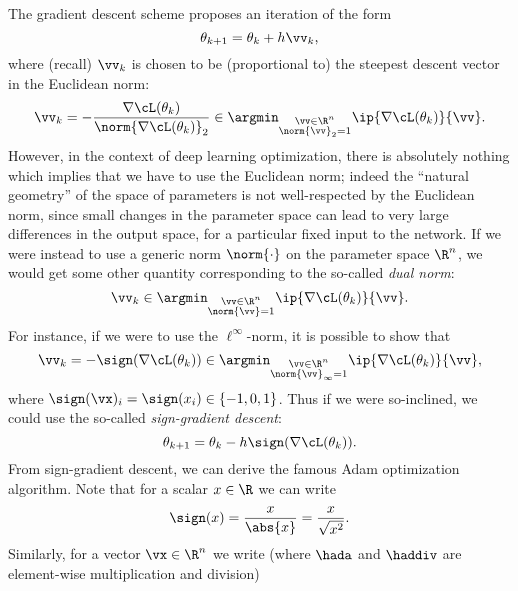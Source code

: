 \documentclass[../../book-main.tex]{subfiles}
\begin{document}
The gradient descent scheme proposes an iteration of the form 
\begin{equation}
    \theta_{k + 1} = \theta_{k} + h\vv_{k},
\end{equation}
where (recall) \(\vv_{k}\) is chosen to be (proportional to) the steepest descent vector in the Euclidean norm:
\begin{equation}
    \vv_{k} = -\frac{\nabla \cL(\theta_{k})}{\norm{\nabla \cL(\theta_{k})}_{2}} \in \argmin_{\substack{\vv \in \R^{n} \\ \norm{\vv}_{2} = 1}}\ip{\nabla \cL(\theta_{k})}{\vv}.
\end{equation}
However, in the context of deep learning optimization, there is absolutely nothing which implies that we have to use the Euclidean norm; indeed the ``natural geometry'' of the space of parameters is not well-respected by the Euclidean norm, since small changes in the parameter space can lead to very large differences in the output space, for a particular fixed input to the network. If we were instead to use a generic norm \(\norm{\cdot}\) on the parameter space \(\R^{n}\), we would get some other quantity corresponding to the so-called \textit{dual norm}:
\begin{equation}
    \vv_{k} \in \argmin_{\substack{\vv \in \R^{n} \\ \norm{\vv} = 1}}\ip{\nabla \cL(\theta_{k})}{\vv}.
\end{equation}
For instance, if we were to use the \(\ell^{\infty}\)-norm, it is possible to show that 
\begin{equation}
    \vv_{k} = -\sign(\nabla \cL(\theta_{k})) \in \argmin_{\substack{\vv \in \R^{n} \\ \norm{\vv}_{\infty} = 1}}\ip{\nabla \cL(\theta_{k})}{\vv},
\end{equation}
where \(\sign(\vx)_{i} = \sign(x_{i}) \in \{-1, 0, 1\}\). Thus if we were so-inclined, we could use the so-called \textit{sign-gradient descent}:
\begin{equation}\label{eq:sign_gradient_descent}
    \theta_{k + 1} = \theta_{k} - h\sign(\nabla \cL(\theta_{k})).
\end{equation}
From sign-gradient descent, we can derive the famous Adam optimization algorithm. Note that for a scalar \(x \in \R\) we can write
\begin{equation}
    \sign(x) = \frac{x}{\abs{x}} = \frac{x}{\sqrt{x^{2}}}.
\end{equation}
Similarly, for a vector \(\vx \in \R^{n}\) we write (where \(\hada\) and
\(\haddiv\) are element-wise multiplication and division)
\end{document}
